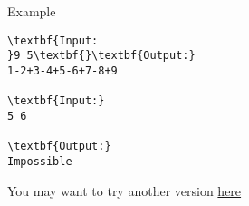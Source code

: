 Example
\begin{verbatim}
\textbf{Input:
}9 5\textbf{}\textbf{Output:}
1-2+3-4+5-6+7-8+9

\textbf{Input:}
5 6

\textbf{Output:}
Impossible

\end{verbatim}

You may want to try another version \href{../../problems/BLOPER2}{here}
